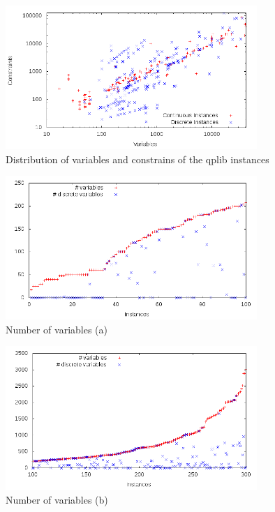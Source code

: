 \begin{enumerate}



\begin{figure}\centering
  \includegraphics[width=0.85\textwidth]{pic_overview.png}
  \caption{Distribution of variables and constrains  of the qplib
instances \label{fig:1}}
\end{figure}

\begin{figure}\centering
  \includegraphics[width=0.85\textwidth]{pic_var_small.png}
  \caption{Number of variables (a) \label{fig:pic_var_small}}
\end{figure}

\begin{figure}\centering
  \includegraphics[width=0.85\textwidth]{pic_var_medium.png}
  \caption{Number of variables (b) \label{fig:pic_var_medium}}
\end{figure}


\end{enumerate}
